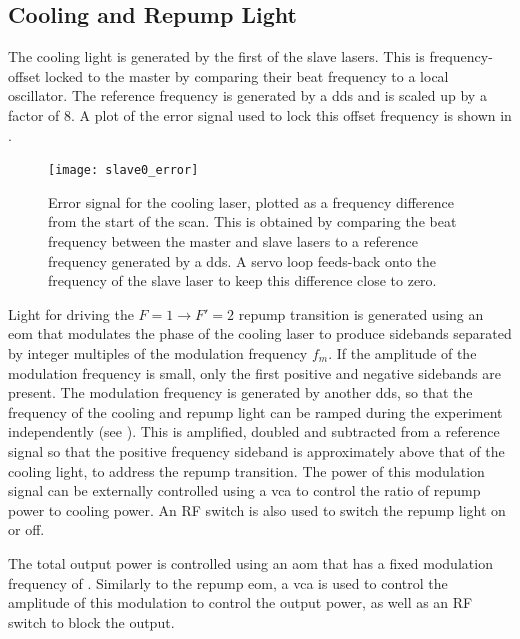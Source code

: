 \subsection{Cooling and Repump Light}
The cooling light is generated by the first of the slave lasers. This is
frequency-offset locked to the master by comparing their beat frequency to a
local oscillator. The reference frequency is generated by a \ac{dds} and is
scaled up by a factor of 8. A plot of the error signal used to lock this offset
frequency is shown in .
\begin{figure}
	\centering
	\texttt{[image: slave0\_error]}
	\caption[Error Signal for the \Muquans\ Cooling laser.]{Error signal for the \Muquans cooling laser, plotted as a frequency difference from the start of the scan. This is obtained by comparing the beat frequency between the master and slave lasers to a reference frequency generated by a \ac{dds}. A servo loop feeds-back onto the frequency of the slave laser to keep this difference close to zero.}\label{fig:slave_offset}
\end{figure}
\par\noindent Light for driving the \(F=1 \rightarrow F'=2\) repump transition
is generated using an \ac{eom} that modulates the phase of the cooling laser to
produce sidebands separated by integer multiples of the modulation frequency
\(f_m\). If the amplitude of the modulation frequency is small, only the first
positive and negative sidebands are present. The modulation frequency is
generated by another \ac{dds}, so that the frequency of the cooling and repump
light can be ramped during the experiment independently (see
). This is amplified, doubled and subtracted
from a  reference signal so that the positive
frequency sideband is approximately  above that of the
cooling light, to address the repump transition. The power of this modulation
signal can be externally controlled using a \ac{vca} to control the ratio of
repump power to cooling power. An RF switch is also used to switch the repump
light on or off. \par\noindent The total output power is controlled using an
\ac{aom} that has a fixed modulation frequency of .
Similarly to the repump \ac{eom}, a \ac{vca} is used to control the amplitude of
this modulation to control the output power, as well as an RF switch to block
the output.

